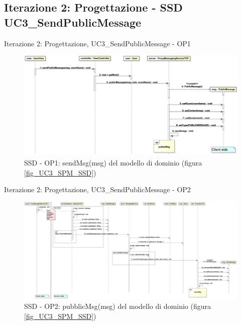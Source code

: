 \subsection{Iterazione 2: Progettazione - SSD UC3\_SendPublicMessage}
\begin{frame} {Iterazione 2: Progettazione, UC3\_SendPublicMessage - OP1}
   \begin{figure}
     \includegraphics[scale=0.16]{image_astah/Iteration_2_DesignModel/UC3_SendPublicMessage_SSD_1_sendMsg.png}{\centering}
     \caption{SSD - OP1: sendMsg(msg) del modello di dominio (figura \ref{fig_UC3_SPM_SSD}) }
     \label{fig_UC3_SSD_SRM_1} 
   \end{figure}
\end{frame}

\begin{frame} {Iterazione 2: Progettazione, UC3\_SendPublicMessage - OP2}
   \begin{figure}
     \includegraphics[scale=0.09]{image_astah/Iteration_2_DesignModel/UC3_SendPublicMessage_SSD_2_publicMsg.png}{\centering}
     \caption{SSD - OP2: pubblicMsg(msg) del modello di dominio (figura \ref{fig_UC3_SPM_SSD}) }
     \label{fig_UC3_SSD_SRM_2} 
   \end{figure}
\end{frame}

